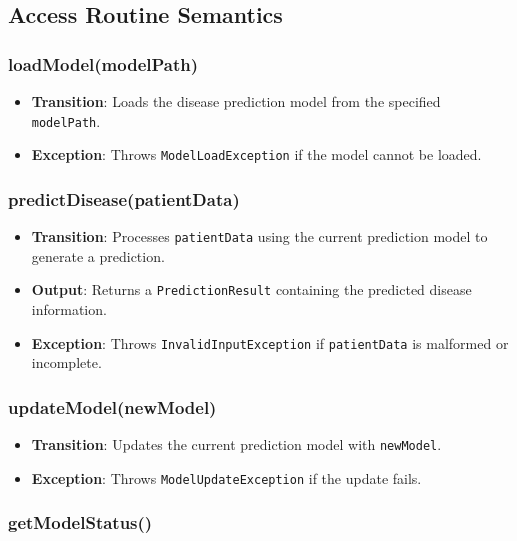 \documentclass[12pt, titlepage]{article}
\begin{document}
\subsection{Access Routine Semantics}
\subsubsection{loadModel(modelPath)}

\begin{itemize}
    \item \textbf{Transition}: Loads the disease prediction model from the specified \texttt{modelPath}.
    \item \textbf{Exception}: Throws \texttt{ModelLoadException} if the model cannot be loaded.
\end{itemize}

\subsubsection{predictDisease(patientData)}

\begin{itemize}
    \item \textbf{Transition}: Processes \texttt{patientData} using the current prediction model to generate a prediction.
    \item \textbf{Output}: Returns a \texttt{PredictionResult} containing the predicted disease information.
    \item \textbf{Exception}: Throws \texttt{InvalidInputException} if \texttt{patientData} is malformed or incomplete.
\end{itemize}

\subsubsection{updateModel(newModel)}

\begin{itemize}
    \item \textbf{Transition}: Updates the current prediction model with \texttt{newModel}.
    \item \textbf{Exception}: Throws \texttt{ModelUpdateException} if the update fails.
\end{itemize}

\subsubsection{getModelStatus()}
\end{document}
